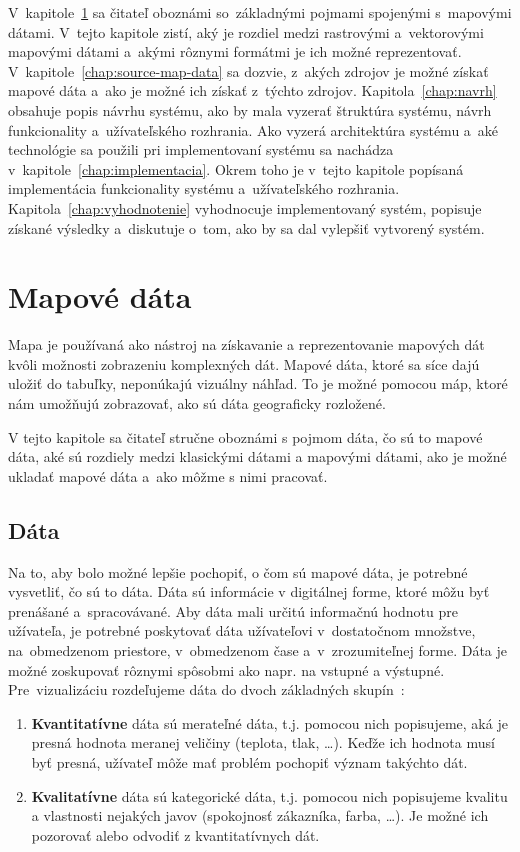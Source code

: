 V~kapitole~\ref{chap:map-data} sa čitateľ oboznámi so~základnými pojmami spojenými s~mapovými dátami. V~tejto kapitole zistí, aký je rozdiel medzi rastrovými a~vektorovými mapovými dátami a~akými rôznymi formátmi je ich možné reprezentovať. V~kapitole~\ref{chap:source-map-data} sa dozvie, z~akých zdrojov je možné získať mapové dáta a~ako je možné ich získať z~týchto zdrojov. Kapitola~\ref{chap:navrh} obsahuje popis návrhu systému, ako by mala vyzerať štruktúra systému, návrh funkcionality a~užívateľského rozhrania. Ako vyzerá architektúra systému a~aké technológie sa použili pri implementovaní systému sa nachádza v~kapitole~\ref{chap:implementacia}. Okrem toho je v~tejto kapitole popísaná implementácia funkcionality systému a~užívateľského rozhrania. Kapitola~\ref{chap:vyhodnotenie} vyhodnocuje implementovaný systém, popisuje získané výsledky a~diskutuje o~tom, ako by sa dal vylepšiť vytvorený systém.



\chapter{Mapové dáta}
\label{chap:map-data}
Mapa je používaná ako nástroj na získavanie a reprezentovanie mapových dát kvôli možnosti zobrazeniu komplexných dát. Mapové dáta, ktoré sa síce dajú uložiť do tabuľky, neponúkajú vizuálny náhľad. To je možné pomocou máp, ktoré nám umožňujú zobrazovať, ako sú dáta geograficky rozložené.

V tejto kapitole sa čitateľ stručne oboznámi s pojmom dáta, čo sú to mapové dáta, aké sú rozdiely medzi klasickými dátami a mapovými dátami, ako je možné ukladať mapové dáta a~ako môžme s nimi pracovať.
 

\section{Dáta}
Na to, aby bolo možné lepšie pochopiť, o čom sú mapové dáta, je potrebné vysvetliť, čo sú to dáta. Dáta sú informácie v digitálnej forme, ktoré môžu byť prenášané a~spracovávané. Aby dáta mali určitú informačnú hodnotu pre užívateľa, je potrebné poskytovať dáta užívateľovi v~dostatočnom množstve, na~obmedzenom priestore, v~obmedzenom čase a~v~zrozumiteľnej forme. Dáta je možné zoskupovať rôznymi spôsobmi ako napr. na vstupné a výstupné. Pre~vizualizáciu rozdeľujeme dáta do dvoch základných skupín~\cite{hynek2021webvisual}:
\begin{enumerate}
    \item \textbf{Kvantitatívne} dáta sú merateľné dáta, t.j. pomocou nich popisujeme, aká je presná hodnota meranej veličiny (teplota, tlak, \ldots). Keďže ich hodnota musí byť presná, užívateľ môže mať problém pochopiť význam takýchto dát.
    \item \textbf{Kvalitatívne} dáta sú kategorické dáta, t.j. pomocou nich popisujeme kvalitu a vlastnosti nejakých javov (spokojnosť zákazníka, farba, \ldots). Je možné ich pozorovať alebo odvodiť z kvantitatívnych dát.
\end{enumerate}

